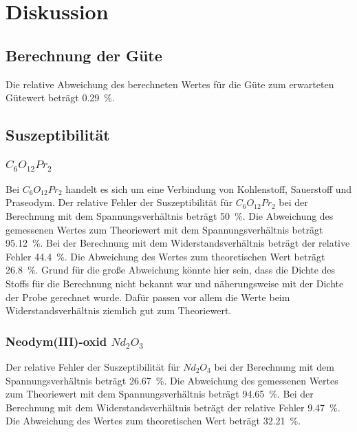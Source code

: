 \section{Diskussion}
\label{sec:Diskussion}

\subsection{Berechnung der Güte}
Die relative Abweichung des berechneten Wertes für die Güte zum erwarteten Gütewert beträgt \SI{0.29}{\percent}. 

\subsection{Suszeptibilität}
\subsubsection{$C_6 O_{12} Pr_2$}
Bei $C_6 O_{12} Pr_2$ handelt es sich um eine Verbindung von Kohlenstoff, Sauerstoff und Praseodym.
\newline
Der relative Fehler der Suszeptibilität für $C_6 O_{12} Pr_2$ bei der Berechnung mit dem Spannungsverhältnis beträgt \SI{50}{\percent}. 
Die Abweichung des gemessenen Wertes zum Theoriewert mit dem Spannungsverhältnis beträgt \SI{95.12}{\percent}.
\newline
Bei der Berechnung mit dem Widerstandsverhältnis beträgt der relative Fehler \SI{44.4}{\percent}.
Die Abweichung des Wertes zum theoretischen Wert beträgt \SI{26.8}{\percent}.
\newline
Grund für die große Abweichung könnte hier sein, dass die Dichte des Stoffs für die Berechnung nicht bekannt war und 
näherungsweise mit der Dichte der Probe gerechnet wurde. 
Dafür passen vor allem die Werte beim Widerstandsverhältnis ziemlich gut zum Theoriewert.

\subsubsection{Neodym(III)-oxid $Nd_2 O_3$}
Der relative Fehler der Suszeptibilität für $Nd_2 O_3$ bei der Berechnung mit dem Spannungsverhältnis beträgt \SI{26.67}{\percent}. 
Die Abweichung des gemessenen Wertes zum Theoriewert mit dem Spannungsverhältnis beträgt \SI{94.65}{\percent}.
\newline
Bei der Berechnung mit dem Widerstandsverhältnis beträgt der relative Fehler \SI{9.47}{\percent}.
Die Abweichung des Wertes zum theoretischen Wert beträgt \SI{32.21}{\percent}.

